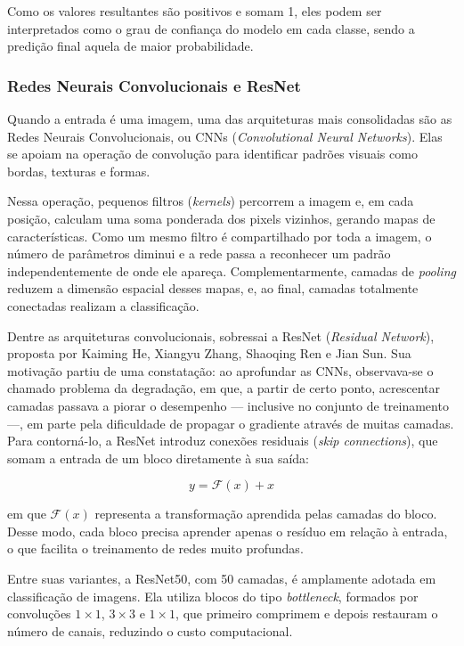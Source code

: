 Como os valores resultantes são positivos e somam 1, eles podem ser interpretados como o grau de confiança do modelo em cada classe, sendo a predição final aquela de maior probabilidade.

\subsubsection{Redes Neurais Convolucionais e ResNet}
\hspace{+15pt}

Quando a entrada é uma imagem, uma das arquiteturas mais consolidadas são as Redes Neurais Convolucionais, ou CNNs (\textit{Convolutional Neural Networks}). Elas se apoiam na operação de convolução para identificar padrões visuais como bordas, texturas e formas.

Nessa operação, pequenos filtros (\textit{kernels}) percorrem a imagem e, em cada posição, calculam uma soma ponderada dos pixels vizinhos, gerando mapas de características. Como um mesmo filtro é compartilhado por toda a imagem, o número de parâmetros diminui e a rede passa a reconhecer um padrão independentemente de onde ele apareça. Complementarmente, camadas de \textit{pooling} reduzem a dimensão espacial desses mapas, e, ao final, camadas totalmente conectadas realizam a classificação. %

Dentre as arquiteturas convolucionais, sobressai a ResNet (\textit{Residual Network}), proposta por Kaiming He, Xiangyu Zhang, Shaoqing Ren e Jian Sun. %
Sua motivação partiu de uma constatação: ao aprofundar as CNNs, observava-se o chamado problema da degradação, em que, a partir de certo ponto, acrescentar camadas passava a piorar o desempenho — inclusive no conjunto de treinamento —, em parte pela dificuldade de propagar o gradiente através de muitas camadas. Para contorná-lo, a ResNet introduz conexões residuais (\textit{skip connections}), que somam a entrada de um bloco diretamente à sua saída:

\begin{equation}
y = \mathcal{F}(x) + x
\end{equation}

\noindent em que $\mathcal{F}(x)$ representa a transformação aprendida pelas camadas do bloco. Desse modo, cada bloco precisa aprender apenas o resíduo em relação à entrada, o que facilita o treinamento de redes muito profundas.

Entre suas variantes, a ResNet50, com 50 camadas, é amplamente adotada em classificação de imagens. Ela utiliza blocos do tipo \textit{bottleneck}, formados por convoluções $1\times1$, $3\times3$ e $1\times1$, que primeiro comprimem e depois restauram o número de canais, reduzindo o custo computacional.

